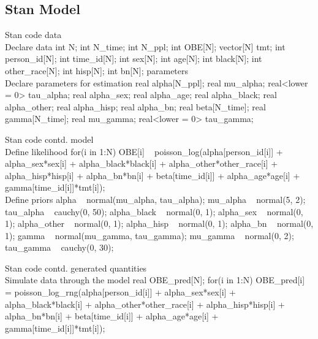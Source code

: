 \documentclass{article}
\begin{document}
\subsection*{Stan Model}
\begin{sexylisting}{Stan code}
data{
  \\ Declare data
  int N;
  int N_time;
  int N_ppl;
  int OBE[N];
  vector[N] tmt;
  int person_id[N];
  int time_id[N];
  int sex[N];
  int age[N];
  int black[N];
  int other_race[N];
  int hisp[N];
  int bn[N];
}
parameters{
  \\ Declare parameters for estimation
  real alpha[N_ppl];
  real mu_alpha;
  real<lower = 0> tau_alpha;
  real alpha_sex;
  real alpha_age;
  real alpha_black;
  real alpha_other;
  real alpha_hisp;
  real alpha_bn;
  real beta[N_time];
  real gamma[N_time];
  real mu_gamma;
  real<lower = 0> tau_gamma;
}
\end{sexylisting}
\begin{sexylisting}{Stan code contd.}
model{
  \\ Define likelihood
  for(i in 1:N) {
    OBE[i] ~ poisson_log(alpha[person_id[i]] + alpha_sex*sex[i] 
                         + alpha_black*black[i] 
                         + alpha_other*other_race[i]
                         + alpha_hisp*hisp[i] + alpha_bn*bn[i]
                         + beta[time_id[i]] + alpha_age*age[i]
                         + gamma[time_id[i]]*tmt[i]);
  }
  \\ Define priors
  alpha ~ normal(mu_alpha, tau_alpha);
  mu_alpha ~ normal(5, 2);
  tau_alpha ~ cauchy(0, 50);
  alpha_black ~ normal(0, 1);
  alpha_sex ~ normal(0, 1);
  alpha_other ~ normal(0, 1);
  alpha_hisp ~ normal(0, 1);
  alpha_bn ~ normal(0, 1);
  gamma ~ normal(mu_gamma, tau_gamma);
  mu_gamma ~ normal(0, 2);
  tau_gamma ~ cauchy(0, 30);
}
\end{sexylisting}
\begin{sexylisting}{Stan code contd.}
generated quantities{
  \\ Simulate data through the model
  real OBE_pred[N];
  for(i in 1:N) {
    OBE_pred[i] = poisson_log_rng(alpha[person_id[i]] 
                                  + alpha_sex*sex[i] 
                                  + alpha_black*black[i] 
                                  + alpha_other*other_race[i]
                                  + alpha_hisp*hisp[i] 
                                  + alpha_bn*bn[i]
                                  + beta[time_id[i]] 
                                  + alpha_age*age[i]
                                  + gamma[time_id[i]]*tmt[i]);
  }
}
\end{sexylisting}
\end{document}
